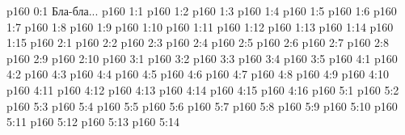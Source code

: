 \author{Промежуточные создания}
\vs p160 0:1  Бла-бла...
\vs p160 1:1 
\vs p160 1:2 \pc 
\vs p160 1:3 
\vs p160 1:4 
\vs p160 1:5 
\vs p160 1:6 
\vs p160 1:7 
\vs p160 1:8 
\vs p160 1:9 
\vs p160 1:10 \pc 
\vs p160 1:11 
\vs p160 1:12 
\vs p160 1:13 \pc 
\vs p160 1:14 
\vs p160 1:15 
\vs p160 2:1 
\vs p160 2:2 
\vs p160 2:3 
\vs p160 2:4 
\vs p160 2:5 
\vs p160 2:6 
\vs p160 2:7 
\vs p160 2:8 
\vs p160 2:9 
\vs p160 2:10 \pc 
{}
\vs p160 3:1 
\vs p160 3:2 
\vs p160 3:3 
\vs p160 3:4 
\vs p160 3:5 
\vs p160 4:1 
\vs p160 4:2 \pc 
\vs p160 4:3 
\vs p160 4:4 
\vs p160 4:5 
\vs p160 4:6 
\vs p160 4:7 
\vs p160 4:8 
\vs p160 4:9 \pc 
\vs p160 4:10 \pc 
\vs p160 4:11 
\vs p160 4:12 
\vs p160 4:13 
\vs p160 4:14 
\vs p160 4:15 
\vs p160 4:16 
\vs p160 5:1 
\vs p160 5:2 
\vs p160 5:3 
\vs p160 5:4 
\vs p160 5:5 
\vs p160 5:6 
\vs p160 5:7 \pc 
\vs p160 5:8 
\vs p160 5:9 
\vs p160 5:10 
\vs p160 5:11 
\vs p160 5:12 
\vs p160 5:13 
\vs p160 5:14 \pc 
\quizlink
